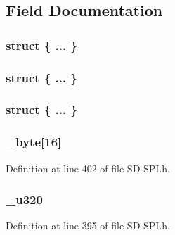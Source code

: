 \subsection{Field Documentation}
\hypertarget{union_c_i_d_ae81756adf5a4ebbf3bced396e1041607}{}\subsubsection[{"@37}]{\setlength{\rightskip}{0pt plus 5cm}struct \{ ... \} }\label{union_c_i_d_ae81756adf5a4ebbf3bced396e1041607}
\hypertarget{union_c_i_d_ae43712e5d64861fa6ae8bd9332278721}{}\subsubsection[{"@39}]{\setlength{\rightskip}{0pt plus 5cm}struct \{ ... \} }\label{union_c_i_d_ae43712e5d64861fa6ae8bd9332278721}
\hypertarget{union_c_i_d_abc77152cb34c7ecf3ccb54315056274a}{}\subsubsection[{"@41}]{\setlength{\rightskip}{0pt plus 5cm}struct \{ ... \} }\label{union_c_i_d_abc77152cb34c7ecf3ccb54315056274a}
\hypertarget{union_c_i_d_a89bb97022529d46ff9cac7274a7b9faa}{}
\subsubsection[{\+\_\+byte}]{ \+\_\+byte\mbox{[}16\mbox{]}}\label{union_c_i_d_a89bb97022529d46ff9cac7274a7b9faa}


Definition at line 402 of file S\+D-\/\+S\+P\+I.\+h.

\hypertarget{union_c_i_d_a446384ca0781a9e9ed10e276b4a58701}{}
\subsubsection[{\+\_\+u320}]{ \+\_\+u320}\label{union_c_i_d_a446384ca0781a9e9ed10e276b4a58701}


Definition at line 395 of file S\+D-\/\+S\+P\+I.\+h.

\hypertarget{union_c_i_d_afcfcec75ab1ad51ac055518c4e4481b1}{}
